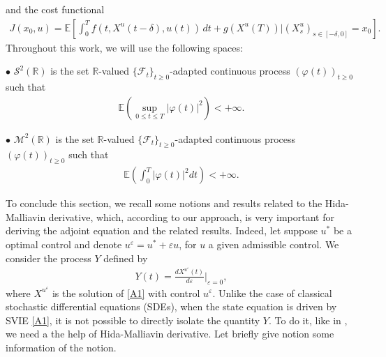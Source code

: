 \documentclass[12pt]{article}
\theoremstyle{remark}
\numberwithin{equation}{section}
\def\R{\mathbb R}
\def\E{\mathbb E}
\def\E{\mathbb E}
\begin{document}
and the cost functional
\begin{eqnarray}\label{cost}
	J(x_0,u) = \mathbb{E} \left[ \int_0^T f(t, X^{u}(t-\delta), u(t)) \, dt + g(X^{u}(T))|(X^{u}_s)_{s\in[-\delta,0]}=x_0 \right].
\end{eqnarray}
Throughout this work, we will use the following spaces: 
\begin{description}
\item $\bullet$ $\mathcal{S}^{2}(\R)$ is the set $\R$-valued $\{ \mathcal{F}_t \}_{t \ge 0}$-adapted continuous process $(\varphi(t))_{t\geq 0}$ such that
\begin{eqnarray*}
	\E\left(\sup_{0\leq t\leq T}|\varphi(t)|^2\right)<+\infty.
\end{eqnarray*}
\item $\bullet$  $\mathcal{M}^{2}(\R)$ is the set $\R$-valued $\{ \mathcal{F}_t \}_{t \ge 0}$-adapted continuous process $(\varphi(t))_{t\geq 0}$ such that
\begin{eqnarray*}
	\E\left(\int^{T}_{0}|\varphi(t)|^2dt\right)<+\infty.
\end{eqnarray*}
\end{description}
To conclude this section, we recall some notions and results related to the Hida-Malliavin derivative, which, according to our approach, is very important for deriving the adjoint equation and the related results. Indeed, let suppose $u^{*}$ be a optimal control and denote $u^{\varepsilon}=u^{*}+\varepsilon u$, for $u$ a given admissible control. We consider the process $Y$ defined by 
\begin{eqnarray*}
	Y(t)=\frac{dX^{u^{\varepsilon}}(t)}{d\varepsilon}|_{\varepsilon=0},
\end{eqnarray*}
where $X^{u^{\varepsilon}}$ is the solution  of \eqref{A1} with control $u^{\varepsilon}$. Unlike the case of classical stochastic differential equations (SDEs), when the state equation is driven by SVIE \eqref{A1}, it is not possible to directly isolate the quantity $Y$. To do it, like in \cite{Agram2018}, we need a the help of Hida-Malliavin derivative. Let briefly give notion some information of the notion.
\end{document}
